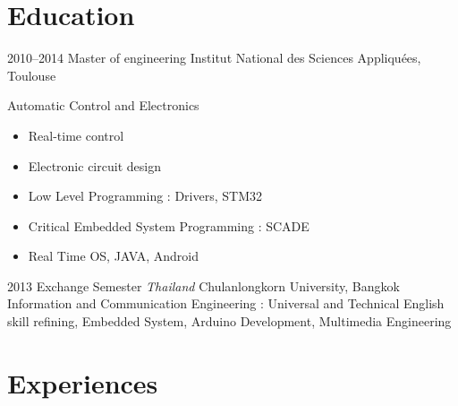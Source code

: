 \documentclass[a4paper]{friggeri-cv} %
\begin{document}

\section{Education}

\begin{entrylist}

\entry
{2010--2014}
{Master of engineering}
{Institut National des Sciences Appliquées, Toulouse}
{Automatic Control and Electronics
\begin{itemize}
\item Real-time control 
\item Electronic circuit design
\item Low Level Programming : Drivers, STM32
\item Critical Embedded System Programming : SCADE
\item Real Time OS, JAVA, Android
\end{itemize}}


\entry
{2013}
{Exchange Semester \textit{Thailand}}
{Chulanlongkorn University, Bangkok}
{Information and Communication Engineering : 
Universal and Technical English skill refining, Embedded System, Arduino Development, Multimedia Engineering}



\end{entrylist}


\section{Experiences}
\end{document}
